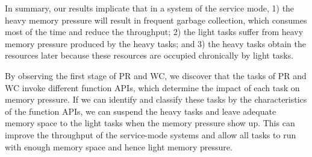In summary, our results implicate that in a system of the service mode, 1) the heavy memory pressure will result in frequent garbage collection, which consumes most of the time and reduce the throughput; 2) the light tasks suffer from heavy memory pressure produced by the heavy tasks; and 3) the heavy tasks obtain the resources later because these resources are occupied chronically by light tasks. %

By observing the first stage of PR and WC, we discover that the tasks of PR and WC invoke different function APIs, which determine the impact of each task on memory pressure. If we can identify and classify these tasks by the characteristics of the function APIs, we can suspend the heavy tasks and leave adequate memory space to the light tasks when the memory pressure show up. This can improve the throughput of the service-mode systems and allow all tasks to run with enough memory space and hence light memory pressure.



